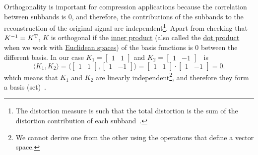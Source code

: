 Orthogonality is important for compression applications because the
correlation between subbands is 0, and therefore, the contributions of
the subbands to the reconstruction of the original signal are
independent\footnote{The distortion measure is such that the total
distortion is the sum of the distortion contribution of each
subband~\cite{sayood2017introduction}.}. Apart from checking that
$K^{-1}=K^{\text T}$, $K$ is orthogonal if the
\href{https://en.wikipedia.org/wiki/Inner_product_space}{inner
  product} (also called the
\href{https://en.wikipedia.org/wiki/Dot_product}{dot product} when we
work with
\href{https://en.wikipedia.org/wiki/Euclidean_space}{Euclidean
  spaces}) of the basis functions is $0$ between the different
basis. In our case $K_1=\begin{bmatrix}1 & 1\end{bmatrix}$ and
$K_2=\begin{bmatrix} 1 & -1\end{bmatrix}$~ is
\begin{equation}
  \langle K_1,K_2 \rangle =
  \langle \begin{bmatrix}
    1 & 1
  \end{bmatrix}
  ,
  \begin{bmatrix}
    1 & -1
  \end{bmatrix}
  \rangle =
  \begin{bmatrix}
    1 & 1
  \end{bmatrix}
  \cdot
  \begin{bmatrix}
    1 & -1
  \end{bmatrix}
   = 0.
\end{equation}
which means that $K_1$ and $K_2$ are linearly independent\footnote{We
cannot derive one from the other using the operations that define a
vector space.}, and therefore they form a basis
(set)~\cite{strang4linear}.


